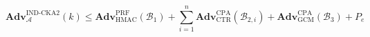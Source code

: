 \documentclass[preview,varwidth=88mm]{standalone}
\begin{document}
\begin{equation*}
\mathbf{Adv}_{\mathcal{A}}^{\text{IND-CKA2}}(k) \le \mathbf{Adv}_{\text{HMAC}}^{\text{PRF}}(\mathcal{B}_1) + \sum_{i=1}^n \mathbf{Adv}_{\text{CTR}}^{\text{CPA}}(\mathcal{B}_{2,i}) + \mathbf{Adv}_{\text{GCM}}^{\text{CPA}}(\mathcal{B}_3) + P_e
\end{equation*}
\end{document}
